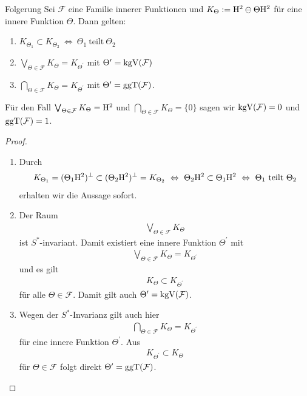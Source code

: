 \begin{genericthm}{Folgerung}
	Sei $ \mathcal{F}$  eine Familie innerer Funktionen und 
	$ K_\Theta := \mathrm{H}^2 \ominus \Theta \mathrm{H}^2$ für eine innere Funktion $ \Theta $.
	Dann gelten:
	\begin{enumerate}[label=\text{\textbf{(\arabic*)}}]
		\item $ K_{\Theta_1} \subset K_{\Theta_2}  \ \Leftrightarrow \ \Theta_1 \ \text{teilt} \ \Theta_2$
		
		\item
		$ \bigvee_{\Theta \in \mathcal{F}} K_\Theta  = K_{\Theta^\prime}$ mit $ \Theta^\prime = \operatorname{kgV}(\mathcal{F})  $
		
		\item
		$ \bigcap_{\Theta \in \mathcal{F}} K_\Theta = K_{\Theta^\prime} $
		mit $ \Theta^\prime = \operatorname{ggT}(\mathcal{F}) $.
	\end{enumerate}
	Für den Fall $ \bigvee_{\Theta \in \mathcal{F}} K_\Theta  = \mathrm{H}^2 $ 
	und $ \bigcap_{\Theta \in \mathcal{F}} K_\Theta = \lbrace 0 \rbrace $ sagen wir $ \operatorname{kgV}( \mathcal{ F}) = 0 $ und $ \operatorname{ggT}(\mathcal{F}) = 1 $.
\end{genericthm}

\begin{proof}
	\begin{enumerate}[label=\text{\textbf{(\arabic*)}}]
		\item
		Durch
		\begin{align*}
		K_{\Theta_1} =  (\Theta_1 \H^2)^\bot  \subset (\Theta_2 \H^2)^\bot = K_{\Theta_2}
		\ \Leftrightarrow \ 
		\Theta_2 \H^2 \subset \Theta_1 \H^2
		\ \Leftrightarrow \
		\Theta_1 \ \text{teilt} \ \Theta_2
		\end{align*}
		erhalten wir die Aussage sofort.
		
		\item
		Der Raum 
		\begin{align*}
		\bigvee_{\Theta \in \mathcal{F}} K_\Theta
		\end{align*}
		ist $ S^\ast $-invariant.
		Damit existiert eine innere Funktion $ \Theta^\prime $ mit
		\begin{align*}
		\bigvee_{\Theta \in \mathcal{F}} K_\Theta = K_{\Theta^\prime}
		\end{align*}
		und es gilt
		\begin{align*}
		K_\Theta \subset K_{\Theta^\prime}
		\end{align*}
		für alle $ \Theta \in \mathcal{F} $.
		Damit gilt auch $ \Theta^\prime = \operatorname{kgV}(\mathcal{F}) $.
		
		\item
		Wegen der $ S^\ast $-Invarianz gilt auch hier 
		\begin{align*}
		\bigcap_{\Theta \in \mathcal{F}} K_\Theta = K_{\Theta^\prime}
		\end{align*}
		für eine innere Funktion $ \Theta^\prime $.
		Aus 
		\begin{align*}
		K_{\Theta^\prime} \subset K_{\Theta}
		\end{align*}
		für $ \Theta \in \mathcal{F} $ folgt direkt $ \Theta^\prime = \operatorname{ggT}(\mathcal{F}) $.
	\end{enumerate}
\end{proof}